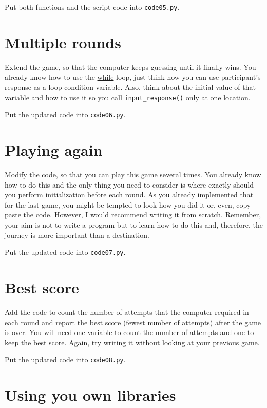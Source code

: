 \documentclass[
]{book}
\begin{document}
Put both functions and the script code into \texttt{code05.py}.

\hypertarget{multiple-rounds}{%
\section{Multiple rounds}\label{multiple-rounds}}

Extend the game, so that the computer keeps guessing until it finally wins. You already know how to use the \protect\hyperlink{while-loop}{while} loop, just think how you can use participant's response as a loop condition variable. Also, think about the initial value of that variable and how to use it so you call \texttt{input\_response()} only at one location.

Put the updated code into \texttt{code06.py}.

\hypertarget{playing-again}{%
\section{Playing again}\label{playing-again}}

Modify the code, so that you can play this game several times. You already know how to do this and the only thing you need to consider is where exactly should you perform initialization before each round. As you already implemented that for the last game, you might be tempted to look how you did it or, even, copy-paste the code. However, I would recommend writing it from scratch. Remember, your aim is not to write a program but to learn how to do this and, therefore, the journey is more important than a destination.

Put the updated code into \texttt{code07.py}.

\hypertarget{best-score-1}{%
\section{Best score}\label{best-score-1}}

Add the code to count the number of attempts that the computer required in each round and
report the best score (fewest number of attempts) after the game is over. You will need one variable to count the number of attempts and one to keep the best score. Again, try writing it without looking at your previous game.

Put the updated code into \texttt{code08.py}.

\hypertarget{using-you-own-libraries}{%
\section{Using you own libraries}\label{using-you-own-libraries}}
\end{document}
